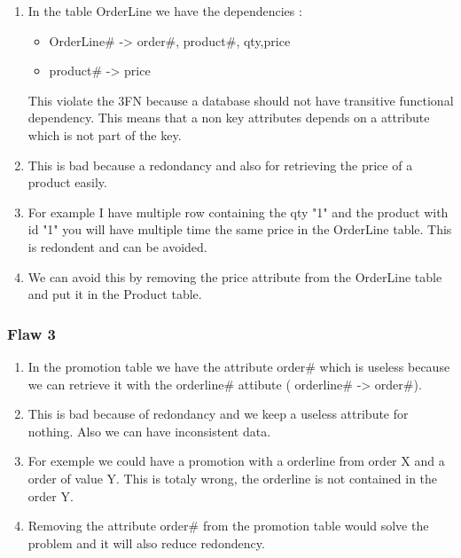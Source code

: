 \documentclass[a4paper, 12pt]{article}
\begin{document}
\begin{enumerate}

\item In the table OrderLine we have the dependencies : 

\begin{itemize}
\item OrderLine# -> order#, product#, qty,price  
\item product# -> price
\end{itemize}

This violate the 3FN because a database should not have transitive functional dependency. This means that a non key attributes depends on
a attribute which is not part of the key.

\item This is bad because a redondancy and also for retrieving the price of a product easily.

\item For example I have multiple row containing the qty "1" and the product with id "1" you will have multiple time the same price in the
OrderLine table. This is redondent and can be avoided.

\item We can avoid this by removing the price attribute from the OrderLine table and put it in the Product table. 
\end{enumerate}

\subsubsection{Flaw 3}


\begin{enumerate}
\item In the promotion table we have the attribute order# which is useless because we can retrieve it with the orderline# attibute ( orderline# -> order#). 

\item This is bad because of redondancy and we keep a useless attribute for nothing. Also we can have inconsistent data.

\item For exemple we could have a promotion with a orderline from order X and a order of value Y. This is totaly wrong, the orderline is not contained in the order Y. 

\item Removing the attribute order# from the promotion table would solve the problem and it will also reduce redondency.
\end{enumerate}
\end{document}
